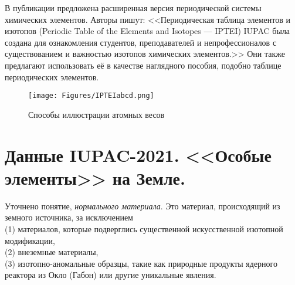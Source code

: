 \documentclass[a5paper,openany]{book}
\begin{document}
В публикации \cite{IUPAC} предложена расширенная версия периодической  системы химических элементов.
Авторы пишут:   
<<Периодическая таблица элементов и изотопов (Periodic Table of the Elements and Isotopes --- IPTEI) IUPAC была создана для ознакомления студентов, преподавателей и непрофессионалов с существованием и важностью изотопов химических элементов.>> Они также предлагают использовать её в качестве наглядного пособия, подобно таблице периодических элементов.


\begin{figure}[ht] 
	\centering\small
	\unitlength=1mm
	\texttt{[image: Figures/IPTEIabcd.png]} 
	\caption{Способы иллюстрации атомных весов} 
	\label{f:IPTEIabcd}
\end{figure}







\chapter{Данные IUPAC-2021. <<Особые элементы>> на Земле.} \label{IUPAC2021ArPb}

Уточнено понятие, \emph{нормального материала}. Это материал, происходящий из земного источника,  \label{NormalSubstance}
за исключением \\
(1) материалов, которые подверглись существенной искусственной изотопной модификации, \\
(2) внеземные материалы,\\
(3) изотопно-аномальные образцы, такие как природные продукты ядерного реактора из Окло (Габон) или другие уникальные явления.
\end{document}
